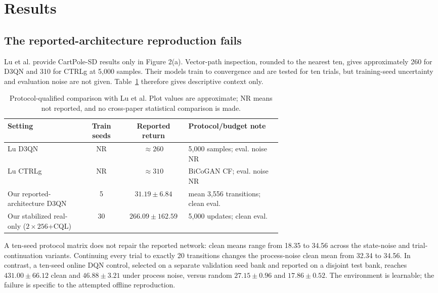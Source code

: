 \documentclass[runningheads]{llncs}
\begin{document}
\section{Results}

\subsection{The reported-architecture reproduction fails}

Lu et al. provide CartPole-SD results only in Figure 2(a). Vector-path
inspection, rounded to the nearest ten, gives approximately 260 for D3QN and
310 for CTRLg at 5,000 samples. Their models train to convergence and are tested
for ten trials, but training-seed uncertainty and evaluation noise are not
given. Table~\ref{tab:direct} therefore gives descriptive context only.

\begin{table}[H]
\centering
\caption{Protocol-qualified comparison with Lu et al. Plot values are
approximate; NR means not reported, and no cross-paper statistical comparison
is made.}
\label{tab:direct}
\small
\begin{tabular}{@{}p{0.29\linewidth}ccp{0.34\linewidth}@{}}
\toprule
Setting & Train seeds & Reported return & Protocol/budget note \\
\midrule
Lu D3QN & NR & $\approx260$ & 5,000 samples; eval. noise NR \\
Lu CTRLg & NR & $\approx310$ & BiCoGAN CF; eval. noise NR \\
Our reported-architecture D3QN & 5 & $31.19\pm6.84$ & mean 3,556 transitions; clean eval. \\
Our stabilized real-only ($2\times256$+CQL) & 30 & $266.09\pm162.59$ & 5,000 updates; clean eval. \\
\bottomrule
\end{tabular}
\end{table}

A ten-seed protocol matrix does not repair the reported network: clean
means range from 18.35 to 34.56 across the state-noise and trial-continuation
variants. Continuing every trial to exactly 20 transitions changes
the process-noise clean mean from 32.34 to 34.56. In contrast, a ten-seed online
DQN control, selected on a separate validation seed bank and reported on a
disjoint test bank, reaches $431.00\pm66.12$ clean and $46.88\pm3.21$ under process
noise, versus random $27.15\pm0.96$ and $17.86\pm0.52$. The environment is
learnable; the failure is specific to the attempted offline reproduction.
\end{document}
